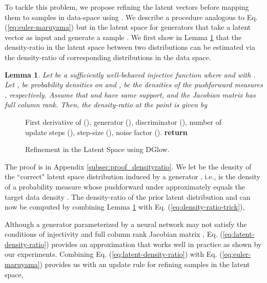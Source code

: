 \documentclass{article} \usepackage{iclr2021_conference,times}
\newtheorem{lemma}[theorem]{Lemma}
\newcommand{\ourmethod}{\textsc{DG}low}
\begin{document}
To tackle this problem, we propose refining the latent vectors before mapping them to samples in data-space using . We describe a procedure analogous to Eq. (\ref{eq:euler-maruyama}) but in the latent space for generators  that take a latent vector  as input and generate a sample . We first show in Lemma \ref{lemma:latent-density-ratio} that the density-ratio in the latent space between two distributions can be estimated via the density-ratio of corresponding distributions in the data space.
\begin{lemma}
\label{lemma:latent-density-ratio}
	Let  be a sufficiently well-behaved injective function where  and  with .
	Let ,  be probability densities on  and ,  be the densities of the pushforward measures ,  respectively. Assume that  and  have same support, and the Jacobian matrix  has full column rank. Then, the density-ratio  at the point  is given by
	
\end{lemma}
\begin{wrapfigure}[12]{r}{0.55\textwidth}
\vspace{-2em}
\begin{minipage}{0.55\textwidth}
\begin{algorithm}[H]
\caption{Refinement in the Latent Space using \ourmethod{}.}
\label{alg:dgflow}
\begin{algorithmic}[1]
\Require First derivative of  (), generator (), discriminator (), number of update steps (), step-size (), noise factor ().
\For{}
\State 
\State 
\EndFor
\State \textbf{return} 
\end{algorithmic}
\end{algorithm}
\end{minipage}
\end{wrapfigure} 
The proof is in Appendix \ref{subsec:proof_densityratio}. We let  be the density of the ``correct" latent space distribution induced by a generator , i.e.,  is the density of a probability measure whose pushforward under  approximately equals the target data density . The density-ratio of the prior latent distribution  and  can now be computed by combining Lemma \ref{lemma:latent-density-ratio} with Eq. (\ref{eq:density-ratio-trick}),

Although a generator  parameterized by a neural network may not satisfy the conditions of injectivity and full column rank Jacobian matrix , Eq. (\ref{eq:latent-density-ratio}) provides an approximation that works well in practice as shown by our experiments. Combining Eq. (\ref{eq:latent-density-ratio}) with Eq. (\ref{eq:euler-maruyama}) provides us with an update rule for refining samples in the latent space,
\end{document}

